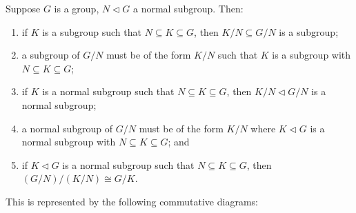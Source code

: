 \begin{theorem}\label{thm:iso-3-group}
    Suppose \(G\) is a group, \(N \lhd G\) a normal subgroup.
    Then:
    \begin{enumerate}[label={(\alph*)}, itemsep=0mm]
        \item if \(K\) is a subgroup such that \(N \subseteq K \subseteq G\),
            then \(K/N \subseteq G/N\) is a subgroup;
        \item a subgroup of \(G/N\) must be of the form \(K/N\)
            such that \(K\) is a subgroup with \(N \subseteq K \subseteq G\);
        \item if \(K\) is a normal subgroup such that \(N \subseteq K \subseteq G\),
            then \(K/N \lhd G/N\) is a normal subgroup;
        \item a normal subgroup of \(G/N\) must be of the form \(K/N\)
            where \(K \lhd G\) is a normal subgroup with \(N \subseteq K \subseteq G\); and
        \item if \(K \lhd G\) is a normal subgroup such that \(N \subseteq K \subseteq G\),
            then \((G/N)/(K/N) \cong G/K\).
    \end{enumerate}

    This is represented by the following commutative diagrams:
    \begin{center}
         \qquad
    \end{center}
\end{theorem}
